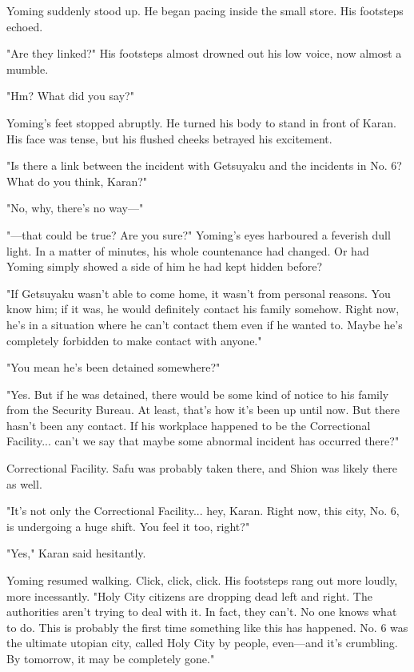 Yoming suddenly stood up. He began pacing inside the small store. His
footsteps echoed.

"Are they linked?" His footsteps almost drowned out his low voice, now
almost a mumble.

"Hm? What did you say?"

Yoming's feet stopped abruptly. He turned his body to stand in front of
Karan. His face was tense, but his flushed cheeks betrayed his
excitement.

"Is there a link between the incident with Getsuyaku and the incidents
in No. 6? What do you think, Karan?"

"No, why, there's no way---"

"---that could be true? Are you sure?" Yoming's eyes harboured a feverish
dull light. In a matter of minutes, his whole countenance had changed.
Or had Yoming simply showed a side of him he had kept hidden before?

"If Getsuyaku wasn't able to come home, it wasn't from personal reasons.
You know him; if it was, he would definitely contact his family somehow.
Right now, he's in a situation where he can't contact them even if he
wanted to. Maybe he's completely forbidden to make contact with anyone."

"You mean he's been detained somewhere?"

"Yes. But if he was detained, there would be some kind of notice to his
family from the Security Bureau. At least, that's how it's been up until
now. But there hasn't been any contact. If his workplace happened to be
the Correctional Facility... can't we say that maybe some abnormal
incident has occurred there?"

Correctional Facility. Safu was probably taken there, and Shion was
likely there as well.

"It's not only the Correctional Facility... hey, Karan. Right now, this
city, No. 6, is undergoing a huge shift. You feel it too, right?"

"Yes," Karan said hesitantly.

Yoming resumed walking. Click, click, click. His footsteps rang out more
loudly, more incessantly. "Holy City citizens are dropping dead left and
right. The authorities aren't trying to deal with it. In fact, they
can't. No one knows what to do. This is probably the first time
something like this has happened. No. 6 was the ultimate utopian city,
called Holy City by people, even---and it's crumbling. By tomorrow, it may
be completely gone."


